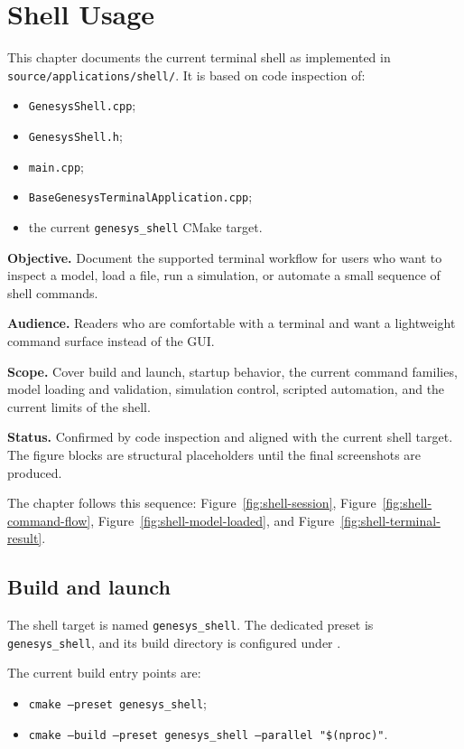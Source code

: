 \chapter{Shell Usage}
\label{chap:shell-usage}

This chapter documents the current terminal shell as implemented in
\texttt{source/applications/shell/}. It is based on code inspection of:
\begin{itemize}
\item \texttt{GenesysShell.cpp};
\item \texttt{GenesysShell.h};
\item \texttt{main.cpp};
\item \texttt{BaseGenesysTerminalApplication.cpp};
\item the current \texttt{genesys\_shell} CMake target.
\end{itemize}

\noindent\textbf{Objective.} Document the supported terminal workflow for users
who want to inspect a model, load a file, run a simulation, or automate a
small sequence of shell commands.

\noindent\textbf{Audience.} Readers who are comfortable with a terminal and
want a lightweight command surface instead of the GUI.

\noindent\textbf{Scope.} Cover build and launch, startup behavior, the current
command families, model loading and validation, simulation control, scripted
automation, and the current limits of the shell.

\noindent\textbf{Status.} Confirmed by code inspection and aligned with the
current shell target. The figure blocks are structural placeholders until the
final screenshots are produced.

The chapter follows this sequence:
Figure~\ref{fig:shell-session},
Figure~\ref{fig:shell-command-flow},
Figure~\ref{fig:shell-model-loaded}, and
Figure~\ref{fig:shell-terminal-result}.

\section{Build and launch}
\label{sec:shell-build-and-launch}

The shell target is named \texttt{genesys\_shell}. The dedicated preset is
\texttt{genesys\_shell}, and its build directory is configured under
.

The current build entry points are:
\begin{itemize}
\item \texttt{cmake --preset genesys\_shell};
\item \texttt{cmake --build --preset genesys\_shell --parallel "\$(nproc)"}.
\end{itemize}

